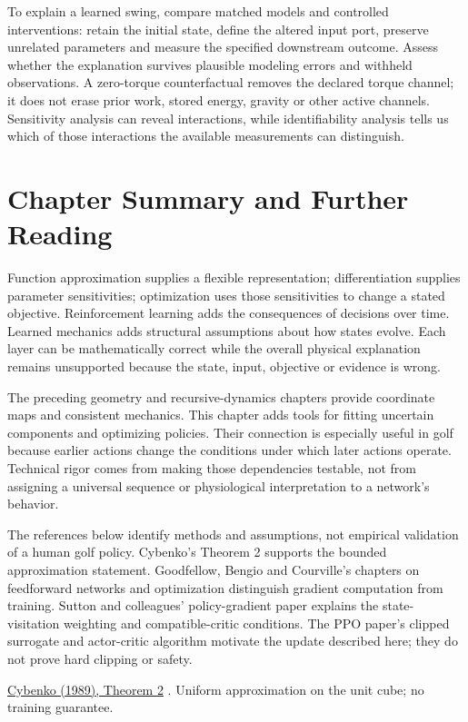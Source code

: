 To explain a learned swing, compare matched models and controlled interventions: retain the initial state, define the altered input port, preserve unrelated parameters and measure the specified downstream outcome. Assess whether the explanation survives plausible modeling errors and withheld observations. A zero-torque counterfactual removes the declared torque channel; it does not erase prior work, stored energy, gravity or other active channels. Sensitivity analysis can reveal interactions, while identifiability analysis tells us which of those interactions the available measurements can distinguish.

\section{Chapter Summary and Further Reading}

Function approximation supplies a flexible representation; differentiation supplies parameter sensitivities; optimization uses those sensitivities to change a stated objective. Reinforcement learning adds the consequences of decisions over time. Learned mechanics adds structural assumptions about how states evolve. Each layer can be mathematically correct while the overall physical explanation remains unsupported because the state, input, objective or evidence is wrong.

The preceding geometry and recursive-dynamics chapters provide coordinate maps and consistent mechanics. This chapter adds tools for fitting uncertain components and optimizing policies. Their connection is especially useful in golf because earlier actions change the conditions under which later actions operate. Technical rigor comes from making those dependencies testable, not from assigning a universal sequence or physiological interpretation to a network's behavior.

The references below identify methods and assumptions, not empirical validation of a human golf policy. Cybenko's Theorem 2 supports the bounded approximation statement. Goodfellow, Bengio and Courville's chapters on feedforward networks and optimization distinguish gradient computation from training. Sutton and colleagues' policy-gradient paper explains the state-visitation weighting and compatible-critic conditions. The PPO paper's clipped surrogate and actor-critic algorithm motivate the update described here; they do not prove hard clipping or safety.

\href{https://papers.baulab.info/papers/Cybenko-1989.pdf}{Cybenko (1989), Theorem 2} \cite{cybenko1989review}. Uniform approximation on the unit cube; no training guarantee.

